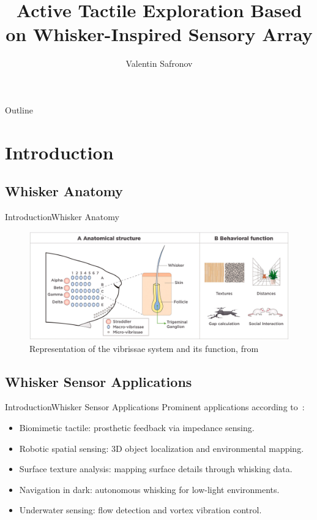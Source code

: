 \documentclass[AIRbeamer
,optEnglish
,optBiber
,optBibstyleAlphabetic
,optBeamerClassicFormat%
]{AIRlatex}
\title[Active Tactile Exploration Based on Whisker-Inspired Sensory Array]{Active Tactile Exploration Based on Whisker-Inspired Sensory Array}
\author[Valentin Safronov]{Valentin Safronov}
\date{\AIRutilsDate{28}{03}{2025}}
\begin{document}
    \AIRbeamerTitlePageStudentThesis

    \begin{frame}{Outline}
        \tableofcontents
    \end{frame}


    \section{Introduction}

    \subsection{Whisker Anatomy}
    \begin{frame}{Introduction}{Whisker Anatomy}
        \begin{figure}[htb]
            \centering
            \includegraphics[width=\textwidth]{figures/whisker-anatomy}
            \caption{Representation of the vibrissae system and its function, from~\cite{IBARRACASTANEDA2022100034}}
        \end{figure}
    \end{frame}

    \subsection{Whisker Sensor Applications}
    \begin{frame}{Introduction}{Whisker Sensor Applications}
        Prominent applications according to~\cite{s22072705}:
        \begin{itemize}
            \item Biomimetic tactile: prosthetic feedback via impedance sensing.
            \item Robotic spatial sensing: 3D object localization and environmental mapping.
            \item Surface texture analysis: mapping surface details through whisking data.
            \item Navigation in dark: autonomous whisking for low-light environments.
            \item Underwater sensing: flow detection and vortex vibration control.
        \end{itemize}
    \end{frame}
\end{document}
